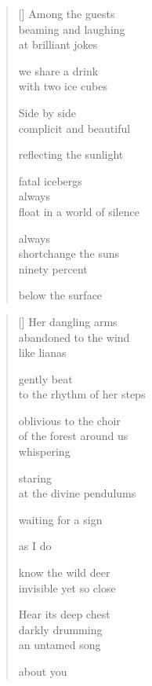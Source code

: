\documentclass[12pt,a4paper]{article}
\begin{document}

\newpage

\poemtitle{}

\settowidth{\versewidth}{float in a world of silence}

\bigskip

\begin{verse}[\versewidth]
  Among the guests \\
  beaming and laughing \\
  at brilliant jokes

  we share a drink \\
  with two ice cubes

  Side by side \\
  complicit and beautiful

  reflecting the sunlight

  fatal icebergs \\
  always \\
  float in a world of silence

  always \\
  shortchange the suns \\
  ninety percent

  below the surface
\end{verse}


\newpage

\poemtitle{}

\settowidth{\versewidth}{to the rhythm of her steps}

\bigskip

\begin{verse}[\versewidth]
  Her dangling arms \\
  abandoned to the wind \\
  like lianas

  gently beat \\
  to the rhythm of her steps

  oblivious to the choir \\
  of the forest around us \\
  whispering

  staring \\
  at the divine pendulums

  waiting for a sign

  as I do

  know the wild deer \\
  invisible yet so close

  Hear its deep chest \\
  darkly drumming \\
  an untamed song

  about you
\end{verse}
\end{document}
